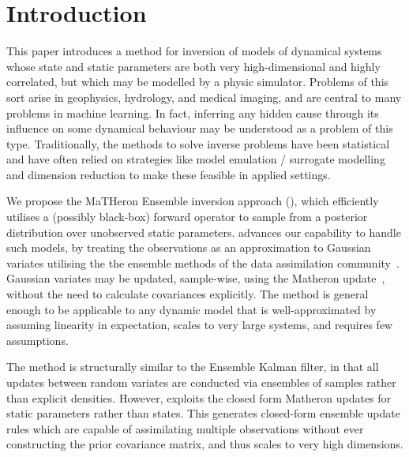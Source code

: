 \section{Introduction}
This paper introduces a method for inversion of models of dynamical systems whose state and static parameters are both very high-dimensional and highly correlated, but which may be modelled by a physic simulator. 
Problems of this sort arise in geophysics, hydrology, and medical imaging, and are central to many problems in machine learning.
In fact, inferring any hidden cause through its influence on some dynamical behaviour may be understood as a problem of this type.
Traditionally, the methods to solve inverse problems have been statistical \cite{TarantolaInverse2005} and have often relied on strategies like model emulation / surrogate modelling and dimension reduction to make these feasible in applied settings.  

 We propose the MaTHeron Ensemble inversion approach (\meth{}), which efficiently utilises a (possibly black-box) forward operator to sample from a posterior distribution over unobserved  static parameters.
\meth{} advances our capability to handle such models, by treating the observations as an  approximation to Gaussian variates utilising the the ensemble methods of the data assimilation community~\cite{EvensenData2009}.
Gaussian variates may be updated, sample-wise, using the Matheron update~\cite{DoucetNote2010,WilsonEfficiently2020}, without the need to calculate covariances explicitly.
The method is general enough to be applicable to any dynamic model that is well-approximated by assuming linearity in expectation, scales to very large systems, and requires few assumptions.

The method is structurally similar to the Ensemble Kalman filter, in that all updates between random variates are conducted via ensembles of samples rather than explicit densities.
However, \meth{} exploits the closed form Matheron updates for static parameters rather than states. This generates closed-form ensemble update rules which are capable of assimilating multiple observations without ever constructing the prior covariance matrix, and thus scales to very high dimensions.